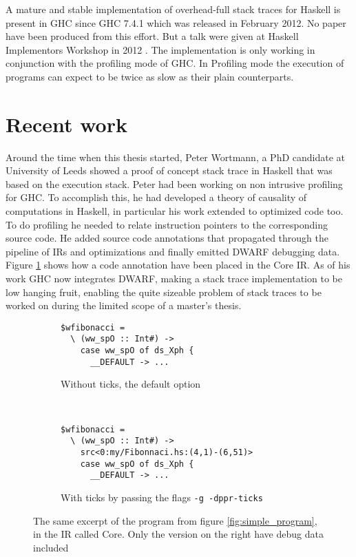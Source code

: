 A mature and stable implementation of overhead-full stack traces for
Haskell is present in GHC since GHC 7.4.1 which was released in February
2012. No paper have been produced from this effort. But a talk were
given at Haskell Implementors Workshop in 2012 \cite{HIW2012Programme}.
The implementation is only working in conjunction with the profiling
mode of GHC. In Profiling mode the execution of programs can expect to
be twice as slow as their plain counterparts.

\section{Recent work} \label{sec:recent_work}

Around the time when this thesis started, Peter Wortmann, a
PhD candidate at University of Leeds showed a proof of concept
stack trace in Haskell that was based on the execution stack.
\cite{stack_traces_ticket} Peter had been working on non intrusive
profiling for GHC. To accomplish this, he had developed a theory of
causality of computations in Haskell, in particular his work extended to
optimized code too. \cite{DBLP:conf/haskell/WortmannD13} To do profiling
he needed to relate instruction pointers to the corresponding source
code. He added source code annotations that propagated
through the pipeline of IRs and optimizations and finally emitted DWARF
debugging data. Figure \ref{fig:core_and_ticks} shows how a code annotation have been placed in the Core IR. As of his work GHC now integrates DWARF, making a
stack trace implementation to be low hanging fruit, enabling the quite
sizeable problem of stack traces to be worked on during the limited
scope of a master's thesis.

\begin{figure}
\begin{mdframed}
        \begin{subfigure}[t]{0.4\textwidth}
            \begin{verbatim}
$wfibonacci =
  \ (ww_spO :: Int#) ->
    case ww_spO of ds_Xph {
      __DEFAULT -> ...
            \end{verbatim}
            \caption{Without ticks, the default option}
        \end{subfigure}
        ~ %
        \begin{subfigure}[t]{0.6\textwidth}
          \begin{verbatim}
$wfibonacci =
  \ (ww_spO :: Int#) ->
    src<0:my/Fibonnaci.hs:(4,1)-(6,51)>
    case ww_spO of ds_Xph {
      __DEFAULT -> ...
          \end{verbatim}
          \caption{With ticks by passing the flags \texttt{-g -dppr-ticks}}
        \end{subfigure}
        \caption{The same excerpt of the program from figure
\ref{fig:simple_program}, in the IR called Core. Only the version on the
right have debug data included }\label{fig:core_and_ticks}
\end{mdframed}
\end{figure}

